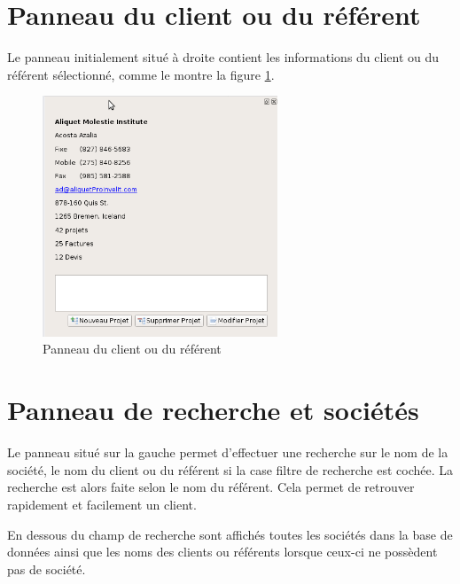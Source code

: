 \section{Panneau du client ou du référent}
Le panneau initialement situé à droite contient les informations du client ou du référent sélectionné, comme le montre la figure
\ref{fig:rightpanel}.

\begin{figure}[H]
	\centering
	\includegraphics[width=7cm]{screens/dockDroite.png}
	\caption{Panneau du client ou du référent}
	\label{fig:rightpanel}
\end{figure}

\section{Panneau de recherche et sociétés}
Le panneau situé sur la gauche permet d’effectuer une recherche sur le nom de la société, le nom du client ou du référent si la case filtre de recherche est cochée. La recherche est alors faite selon le nom du référent. Cela permet de retrouver rapidement et facilement un client.

En dessous du champ de recherche sont affichés toutes les sociétés dans la base de données ainsi que les noms des clients ou référents lorsque ceux-ci ne possèdent pas de société.




